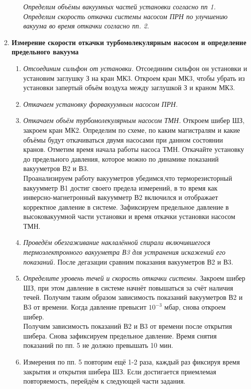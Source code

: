 \documentclass[a4paper,12pt]{article}
\begin{document}
\begin{enumerate}
\begin{enumerate}
	\emph{Определим объёмы вакуумных частей установки согласно пп 1. Определим скорость откачки системы насосом ПРН по улучшению вакуума во время откачки согласно пп. 2.}
	
\end{enumerate}

\item \textbf{Измерение скорости откачки турбомолекулярным насосом и определение предельного вакуума}
\begin{enumerate}
	\item \textit{Отсоединим сильфон от установки.} Отсоединим сильфон он установки и установим заглушку З на кран МК3. Откроем кран МК3, чтобы убрать из установки запертый объём воздуха между заглушкой З и краном МК3.
	\item \textit{Откачаем установку форвакуумным насосом ПРН.}
	\item \textit{Откачаем объём турбомолекулярным насосом ТМН.} Откроем  шибер ШЗ,  закроем  кран МК2.  Определим  по схеме, по каким магистралям и какие объёмы будут откачиваться двумя насосами при данном состоянии кранов. Отметим время начала работы насоса ТМН. Откачайте  установку  до  предельного  давления,  которое  можно по динамике показаний вакууметров В2 и В3. \\
	Проанализируем работу вакууметров убедимся,что терморезисторный  вакуумметр В1  достиг  своего  предела  измерений, в то время как инверсно-магнетронный вакуумметр В2 включился и отображает  корректное  давление  в системе.  Зафиксируем  предельное  давление в высоковакуумной части установки и время откачки установки насосом ТМН. 
	\item \textit{Проведём обезгаживание наклалённой спирали включившегося термоэлектронного вакууметра В3 для устранения искажений его показаний.} После дегазации сравним показания вакууметров В2 и В3.
	\item \textit{Определите уровень течей и скорость откачки системы.} Закроем  шибер  ШЗ,  при  этом  давление  в  системе  начнёт  повышаться за счёт наличия течей. Получим таким образом зависимость показаний вакууметров В2 и В3 от времени. Когда давление превысит $10^{-3}$ мбар, снова откроем шибер. \\ 
	Получим зависимость показаний В2 и В3 от времени после открытия шибера. Снова зафиксируем предельное давление. Время снятия показаний по пп. 5 не должно превышать 10 мин.
	\item Измерения  по пп. 5  повторим  ещё 1-2  раза,  каждый  раз  фиксируя время закрытия и открытия шибера ШЗ. Если  достигается  приемлемая  повторяемость,  перейдём к следующей части задания.  
\end{enumerate}


\end{enumerate}
\end{document}
